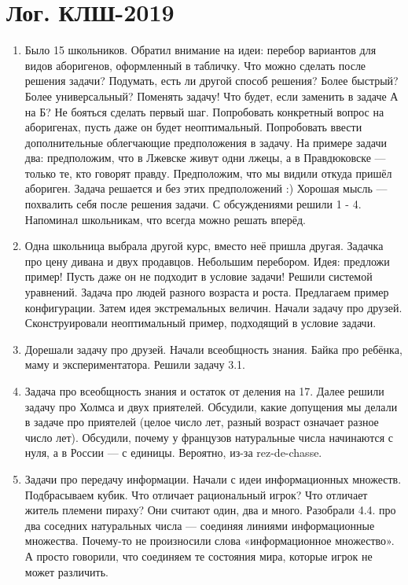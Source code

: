 \documentclass[12pt]{article}
\theoremstyle{definition}
\begin{document}
\section{Лог. КЛШ-2019}

\begin{enumerate}
  \item Было 15 школьников. Обратил внимание на идеи: перебор вариантов для 
  видов аборигенов, оформленный в табличку. Что можно сделать после решения задачи?
  Подумать, есть ли другой способ решения? Более быстрый? Более универсальный?
  Поменять задачу! Что будет, если заменить в задаче А на Б? 
  Не бояться сделать первый шаг. Попробовать конкретный вопрос на аборигенах,
  пусть даже он будет неоптимальный. Попробовать ввести дополнительные облегчающие предположения в задачу.
  На примере задачи два: предположим, что в Лжевске живут одни лжецы, а в Правдюковске — только те, кто говорят правду. 
  Предположим, что мы видили откуда пришёл абориген. Задача решается и без этих предположений :)
  Хорошая мысль — похвалить себя после решения задачи. С обсуждениями решили 1 - 4. Напоминал школьникам, что всегда можно решать вперёд. 
  \item Одна школьница выбрала другой курс, вместо неё пришла другая. Задачка про цену дивана и двух продавцов. Небольшим перебором. Идея: предложи пример! Пусть даже он не подходит
  в условие задачи! Решили системой уравнений. 
  Задача про людей разного возраста и роста. Предлагаем пример конфигурации. Затем идея экстремальных величин.
  Начали задачу про друзей. Сконструировали неоптимальный пример, подходящий в условие задачи. 
  \item Дорешали задачу про друзей. Начали всеобщность знания. Байка про ребёнка, маму и экспериментатора. Решили задачу 3.1. 
  \item Задача про всеобщность знания и остаток от деления на 17. Далее решили задачу про Холмса и двух приятелей.
  Обсудили, какие допущения мы делали в задаче про приятелей (целое число лет, разный возраст означает разное число лет).
  Обсудили, почему у французов натуральные числа начинаются с нуля, а в России — с единицы. Вероятно, из-за rez-de-chasse. 
  \item Задачи про передачу информации. Начали с идеи информационных множеств. Подбрасываем кубик. Что отличает рациональный игрок? 
  Что отличает житель племени пираху? Они считают один, два и много. Разобрали 4.4. про два соседних натуральных числа — соединяя линиями информационные множества.
  Почему-то не произносили слова «информационное множество». А просто говорили, что соединяем те состояния мира, которые игрок не может различить. 

\end{enumerate}
\end{document}
